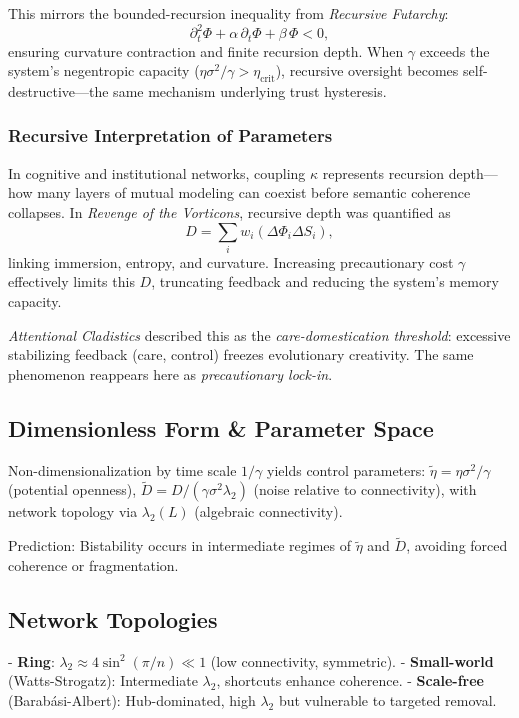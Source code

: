 \documentclass[12pt,a4paper]{article}
\begin{document}
This mirrors the bounded-recursion inequality from \emph{Recursive Futarchy}:
\begin{equation}
\partial_t^2 \Phi + \alpha\,\partial_t \Phi + \beta\,\Phi < 0,
\end{equation}
ensuring curvature contraction and finite recursion depth. When $\gamma$ exceeds the system's negentropic capacity ($\eta \sigma^2 / \gamma > \eta_{\text{crit}}$), recursive oversight becomes self-destructive---the same mechanism underlying trust hysteresis.

\subsubsection{Recursive Interpretation of Parameters}
In cognitive and institutional networks, coupling $\kappa$ represents recursion depth---how many layers of mutual modeling can coexist before semantic coherence collapses. In \emph{Revenge of the Vorticons}, recursive depth was quantified as
\begin{equation}
D = \sum_i w_i (\Delta\Phi_i \Delta S_i),
\end{equation}
linking immersion, entropy, and curvature. Increasing precautionary cost $\gamma$ effectively limits this $D$, truncating feedback and reducing the system's memory capacity.

\emph{Attentional Cladistics} described this as the \emph{care-domestication threshold}: excessive stabilizing feedback (care, control) freezes evolutionary creativity. The same phenomenon reappears here as \emph{precautionary lock-in}.

\subsection{Dimensionless Form \& Parameter Space}
Non-dimensionalization by time scale $1/\gamma$ yields control parameters: $\tilde{\eta} = \eta \sigma^2 / \gamma$ (potential openness), $\tilde{D} = D / (\gamma \sigma^2 \lambda_2)$ (noise relative to connectivity), with network topology via $\lambda_2(L)$ (algebraic connectivity).

Prediction: Bistability occurs in intermediate regimes of $\tilde{\eta}$ and $\tilde{D}$, avoiding forced coherence or fragmentation.

\subsection{Network Topologies}
- \textbf{Ring}: $\lambda_2 \approx 4\sin^2(\pi/n) \ll 1$ (low connectivity, symmetric).
- \textbf{Small-world} (Watts-Strogatz): Intermediate $\lambda_2$, shortcuts enhance coherence.
- \textbf{Scale-free} (Barabási-Albert): Hub-dominated, high $\lambda_2$ but vulnerable to targeted removal.
\end{document}
